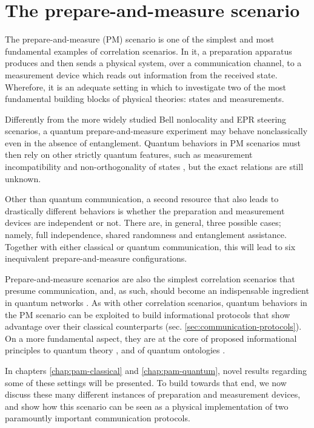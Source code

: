 \chapter{The prepare-and-measure scenario}
\label{chap:pam}

    The prepare-and-measure (PM) scenario is one of the simplest and most fundamental examples of correlation scenarios. In it, a preparation apparatus produces and then sends a physical system, over a communication channel, to a measurement device which reads out information from the received state. Wherefore, it is an adequate setting in which to investigate two of the most fundamental building blocks of physical theories: states and measurements.

    Differently from the more widely studied Bell nonlocality and EPR steering scenarios, a quantum prepare-and-measure experiment may behave nonclassically even in the absence of entanglement. Quantum behaviors in PM scenarios must then rely on other strictly quantum features, such as measurement incompatibility \cite{carmeli_racsincompatibility_2020} and non-orthogonality of states \cite{brunner_dimension_2013}, but the exact relations are still unknown.

    Other than quantum communication, a second resource that also leads to drastically different behaviors is whether the preparation and measurement devices are independent or not. There are, in general, three possible cases; namely, full independence, shared randomness and entanglement assistance. Together with either classical or quantum communication, this will lead to six inequivalent prepare-and-measure configurations.

    Prepare-and-measure scenarios are also the simplest correlation scenarios that presume communication, and, as such, should become an indispensable ingredient in quantum networks \cite{bowles_pamnetworks_2015,poderini_pamcriteria_2020}. As with other correlation scenarios, quantum behaviors in the PM scenario can be exploited to build informational protocols that show advantage over their classical counterparts (sec. \ref{sec:communication-protocols}). On a more fundamental aspect, they are at the core of proposed informational principles to quantum theory \cite{pawlowski_infocausality_2009,pawlowski_infocausalityreview_2011}, and of quantum ontologies \cite{spekkens_2005_contextuality}.

    In chapters \ref{chap:pam-classical} and \ref{chap:pam-quantum}, novel results regarding some of these settings will be presented. To build towards that end, we now discuss these many different instances of preparation and measurement devices, and show how this scenario can be seen as a physical implementation of two paramountly important communication protocols.

